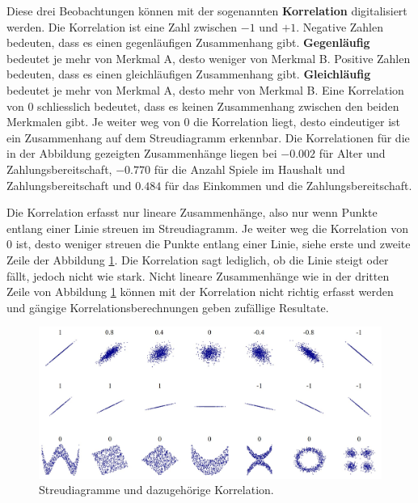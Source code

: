 \documentclass[
]{book}
\theoremstyle{definition}
\theoremstyle{definition}
\theoremstyle{definition}
\theoremstyle{definition}
\theoremstyle{remark}
\begin{document}
\label{customdef-korrelation}{Diese drei Beobachtungen können mit der sogenannten \textbf{Korrelation} digitalisiert werden.} Die Korrelation ist eine Zahl zwischen \(-1\) und \(+1\). Negative Zahlen bedeuten, dass es einen gegenläufigen Zusammenhang gibt. \label{customdef-gegenlaeufig}{\textbf{Gegenläufig} bedeutet je mehr von Merkmal A, desto weniger von Merkmal B.} Positive Zahlen bedeuten, dass es einen gleichläufigen Zusammenhang gibt. \label{customdef-gleichlaeufig}{\textbf{Gleichläufig} bedeutet je mehr von Merkmal A, desto mehr von Merkmal B.} Eine Korrelation von \(0\) schliesslich bedeutet, dass es keinen Zusammenhang zwischen den beiden Merkmalen gibt. Je weiter weg von \(0\) die Korrelation liegt, desto eindeutiger ist ein Zusammenhang auf dem Streudiagramm erkennbar. Die Korrelationen für die in der Abbildung gezeigten Zusammenhänge liegen bei \(-0.002\) für Alter und Zahlungsbereitschaft, \(-0.770\) für die Anzahl Spiele im Haushalt und Zahlungsbereitschaft und \(0.484\) für das Einkommen und die Zahlungsbereitschaft.

Die Korrelation erfasst nur lineare Zusammenhänge, also nur wenn Punkte entlang einer Linie streuen im Streudiagramm. Je weiter weg die Korrelation von \(0\) ist, desto weniger streuen die Punkte entlang einer Linie, siehe erste und zweite Zeile der Abbildung \ref{fig:correlation-examples}. Die Korrelation sagt lediglich, ob die Linie steigt oder fällt, jedoch nicht wie stark. Nicht lineare Zusammenhänge wie in der dritten Zeile von Abbildung \ref{fig:correlation-examples} können mit der Korrelation nicht richtig erfasst werden und gängige Korrelationsberechnungen geben zufällige Resultate.

\begin{figure}

{\centering \includegraphics[width=1\linewidth]{figures/08-correlations-wikipedia} 

}

\caption{Streudiagramme und dazugehörige Korrelation.}\label{fig:correlation-examples}
\end{figure}
\end{document}
